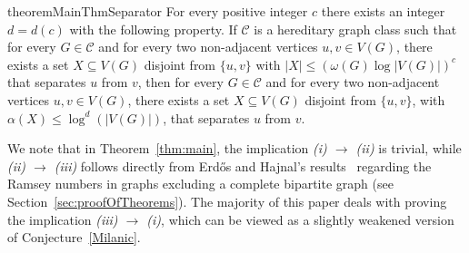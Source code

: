 \documentclass[11pt]{amsart}
\newtheorem{theorem}{Theorem}[section]
\newcommand{\tw}{tw\xspace}
\newcommand{\atw}{tw_{\alpha}\xspace}
\begin{document}
\begin{restatable}{theorem}{MainThmSeparator}\label{thm:ab_separator_in_class}
    For every positive integer $c$ there exists an integer $d=d(c)$ with the following property. If $\mathcal C$ is a hereditary graph class such that for every $G \in \mathcal C$ 
    and for every two non-adjacent vertices $u,v \in V(G)$, there exists a set $X \subseteq V(G)$ disjoint from $\{u,v\}$ with $|X| \leq (\omega(G) \log |V(G)|)^c$ that separates $u$ from $v$, then for every $G \in \mathcal C$
    and for every two non-adjacent vertices $u,v \in V(G)$, there exists a set $X \subseteq V(G)$ disjoint from $\{u,v\}$, with $\alpha(X) \leq \log^d (|V(G)|)$, that separates $u$ from $v$.
\end{restatable}



    
    
    

We note that in Theorem~\ref{thm:main}, the implication {\em (i) $\rightarrow$ (ii)} is trivial, while  {\em (ii) $\rightarrow$ (iii)} follows directly from Erd{\H{o}}s and Hajnal's results~\cite{erdos1989ramsey} regarding the Ramsey numbers in graphs excluding a complete bipartite graph (see Section~\ref{sec:proofOfTheorems}). The majority of this paper deals with proving the implication {\em (iii) $\rightarrow$ (i)}, which can be viewed as a slightly weakened version of Conjecture~\ref{Milanic}.
\end{document}
